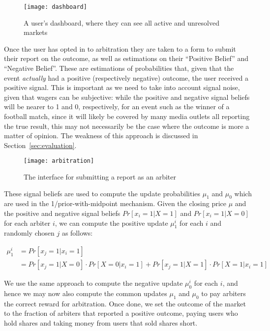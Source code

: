 \begin{figure}[h]
	\centering
	\texttt{[image: dashboard]}
	\caption{A user's dashboard, where they can see all active and unresolved
	markets}
	\label{fig:dashboard}
\end{figure}

Once the user has opted in to arbitration they are taken to a form to submit
their report on the outcome, as well as estimations on their ``Positive
Belief'' and ``Negative Belief''. These are estimations of probabilities that,
given that the event \emph{actually} had a positive (respectively negative)
outcome, the user received a positive signal. This is important as we need to
take into account signal noise, given that wagers can be subjective: while the
positive and negative signal beliefs will be nearer to 1 and 0, respectively,
for an event such as the winner of a football match, since it will likely be
covered by many media outlets all reporting the true result, this may not
necessarily be the case where the outcome is more a matter of opinion. The
weakness of this approach is discussed in Section~\ref{sec:evaluation}.

\begin{figure}[h]
	\centering
	\texttt{[image: arbitration]}
	\caption{The interface for submitting a report as an arbiter}
	\label{fig:resolveSecurity}
\end{figure}

These signal beliefs are used to compute the update probabilities $\mu_1$ and
$\mu_0$ which are used in the 1/prior-with-midpoint mechanism. Given the
closing price $\mu$ and the positive and negative signal beliefs
$Pr[x_i=1|X=1]$ and $Pr[x_i=1|X=0]$ for each arbiter $i$, we can compute the
positive update $\mu_1^i$ for each $i$ and randomly chosen $j$ as follows:

\begin{equation}
	\begin{aligned}
		\mu_1^i & = Pr[x_j=1|x_i=1] \\
		& = Pr[x_j=1|X=0] \cdot Pr[X=0|x_i=1] + Pr[x_j=1|X=1] \cdot Pr[X=1|x_i=1]
	\end{aligned}
\end{equation}

We use the same approach to compute the negative update $\mu_0^i$ for each $i$,
and hence we may now also compute the common updates $\mu_1$ and $\mu_0$ to pay
arbiters the correct reward for arbitration. Once done, we set the outcome of
the market to the fraction of arbiters that reported a positive outcome, paying
users who hold shares and taking money from users that sold shares short.

